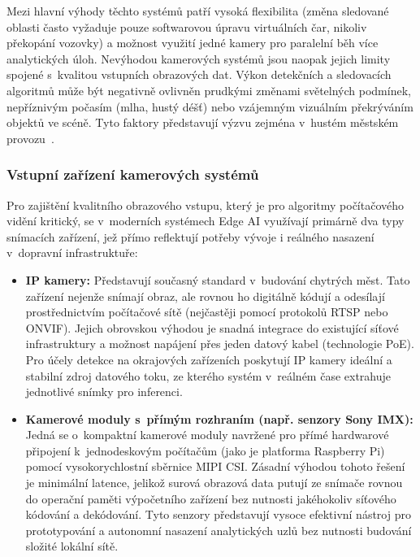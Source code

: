 Mezi hlavní výhody těchto systémů patří vysoká flexibilita (změna sledované oblasti často vyžaduje pouze softwarovou úpravu virtuálních čar, nikoliv překopání vozovky) a možnost využití jedné kamery pro paralelní běh více analytických úloh. Nevýhodou kamerových systémů jsou naopak jejich limity spojené s~kvalitou vstupních obrazových dat. Výkon detekčních a sledovacích algoritmů může být negativně ovlivněn prudkými změnami světelných podmínek, nepříznivým počasím (mlha, hustý déšť) nebo vzájemným vizuálním překrýváním objektů ve scéně. Tyto faktory představují výzvu zejména v~hustém městském provozu~\cite{zhou_traffic_survey_2024}.

\subsubsection{Vstupní zařízení kamerových systémů}
Pro zajištění kvalitního obrazového vstupu, který je pro algoritmy počítačového vidění kritický, se v~moderních systémech \acs{Edge AI} využívají primárně dva typy snímacích zařízení, jež přímo reflektují potřeby vývoje i reálného nasazení v~dopravní infrastruktuře:

\begin{itemize}
    \item \textbf{IP kamery:} Představují současný standard v~budování chytrých měst. Tato zařízení nejenže snímají obraz, ale rovnou ho digitálně kódují a odesílají prostřednictvím počítačové sítě (nejčastěji pomocí protokolů \acs{RTSP} nebo \acs{ONVIF}). Jejich obrovskou výhodou je snadná integrace do existující síťové infrastruktury a možnost napájení přes jeden datový kabel (technologie \acs{PoE}). Pro účely detekce na okrajových zařízeních poskytují \acs{IP} kamery ideální a stabilní zdroj datového toku, ze kterého systém v~reálném čase extrahuje jednotlivé snímky pro inferenci.
    \item \textbf{Kamerové moduly s~přímým rozhraním (např. senzory Sony IMX):} Jedná se o~kompaktní kamerové moduly navržené pro přímé hardwarové připojení k~jednodeskovým počítačům (jako je platforma Raspberry Pi) pomocí vysokorychlostní sběrnice MIPI CSI. Zásadní výhodou tohoto řešení je minimální latence, jelikož surová obrazová data putují ze snímače rovnou do operační paměti výpočetního zařízení bez nutnosti jakéhokoliv síťového kódování a dekódování. Tyto senzory představují vysoce efektivní nástroj pro prototypování a autonomní nasazení analytických uzlů bez nutnosti budování složité lokální sítě.
\end{itemize}

